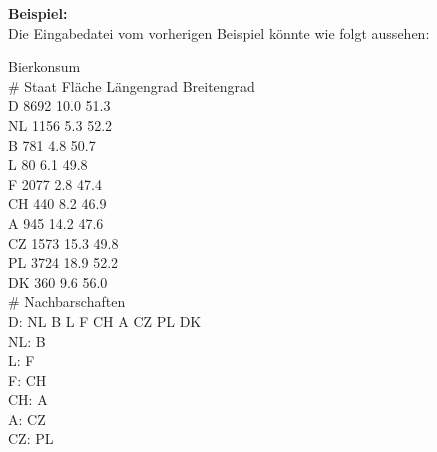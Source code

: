 \documentclass[a4paper,11pt]{article}
\begin{document}
{\textbf{Beispiel:}\\
Die Eingabedatei vom vorherigen Beispiel k\"onnte wie folgt aussehen:\\
\vspace{5mm}
\begin{mdframed}[linewidth=0pt, backgroundcolor=background, innertopmargin=10pt, innerbottommargin=10pt]
Bierkonsum\\
\# Staat Fläche Längengrad Breitengrad\\
D 8692 10.0 51.3\\
NL 1156 5.3 52.2\\
B 781 4.8 50.7\\
L 80 6.1 49.8\\
F 2077 2.8 47.4\\
CH 440 8.2 46.9\\
A 945 14.2 47.6\\
CZ 1573 15.3 49.8\\
PL 3724 18.9 52.2\\
DK 360 9.6 56.0\\
\# Nachbarschaften\\
D: NL B L F CH A CZ PL DK\\
NL: B\\
L: F\\
F: CH\\
CH: A\\
A: CZ\\
CZ: PL
\end{mdframed}
}
\end{document}
